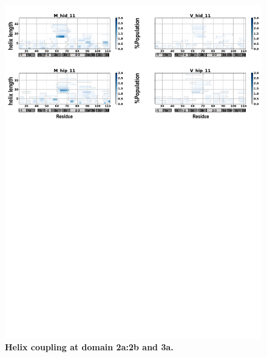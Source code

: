 \documentclass[journal=jacsat,manuscript=article]{achemso}
\begin{document}
\begin{figure}[!ht]
\includegraphics[scale=0.5,width=12cm,trim={0 0cm 0 0cm},clip]{../figures/n1.pdf}
\caption{{\bf Helix coupling at domain 2a:2b and 3a.}
 }
\label{fig6}
\end{figure}
\end{document}
